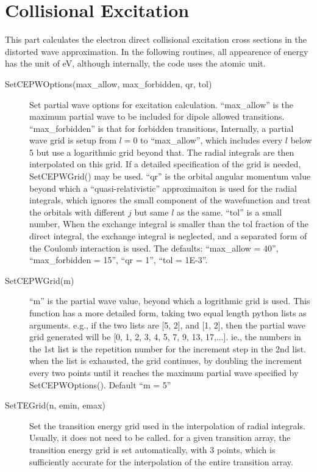 \documentclass[12pt]{article}
\begin{document}
\section{Collisional Excitation}
This part calculates the electron direct collisional excitation cross
sections in the distorted wave approximation. In the following routines, all
appearence of energy has the unit of eV, although internally, the code uses
the atomic unit.

\begin{description}
\item[SetCEPWOptions(max\_allow, max\_forbidden, qr, tol)] 
Set partial wave options for excitation calculation. ``max\_allow'' is the
maximum partial wave to be included for dipole allowed transitions. 
``max\_forbidden'' is that for forbidden transitions,
Internally, a partial wave grid is setup from $l = 0$ to 
``max\_allow'', which includes every $l$ below 5 but use a logarithmic grid
beyond that. The radial integrals are then interpolated on this grid. If
a detailed specification of the grid is needed, SetCEPWGrid() may be used.
``qr'' is the orbital
angular momentum value beyond which a ``quasi-relativistic'' approximaiton
is used for the radial integrals, which ignores the small component of the
wavefunction and treat the orbitals with different $j$ but same $l$ as the
same. ``tol'' is a small number, When the exchange integral is smaller than the
tol fraction of the direct integral, the exchange integral is neglected, and a
separated form of the Coulomb interaction is used. The defaults: ``max\_allow
= 40'', ``max\_forbidden = 15'', ``qr = 1'', ``tol = 1E-3''.

\item[SetCEPWGrid(m)] 
``m'' is the partial wave value, beyond which a logrithmic
grid is used. This function has a more detailed form, taking two equal length
python lists as arguments. e.g., if the two lists are [5, 2], and [1, 2], then
the partial wave grid generated will be [0, 1, 2, 3, 4, 5, 7, 9, 13, 17,...].
ie., the numbers in the 1st list is the repetition number for the increment
step in the 2nd list. when the list is exhausted, the grid continues, by
doubling the increment every two points until it reaches the maximum partial
wave specified by SetCEPWOptions(). Default ``m = 5''

\item[SetTEGrid(n, emin, emax)] 
Set the transition energy grid used in the
interpolation of radial integrals. Usually, it does not need to be
called. for a given transition array, the transition energy grid is set
automatically, with 3 points, which is sufficiently accurate for the
interpolation of the entire transition array. 


\end{description}
\end{document}
